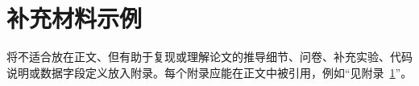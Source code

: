 \chapter{补充材料示例}
\label{app:supplement}

将不适合放在正文、但有助于复现或理解论文的推导细节、问卷、补充实验、代码说明或数据字段定义放入附录。每个附录应能在正文中被引用，例如“见附录~\ref{app:supplement}”。
